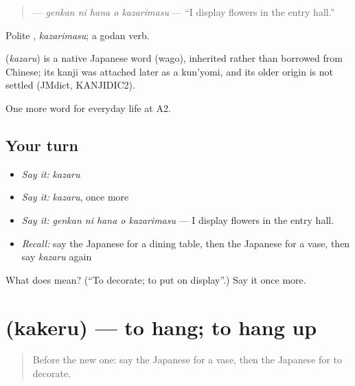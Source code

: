 \begin{quote}
\textbf{  } — \emph{genkan ni hana o kazarimasu} — \textquotedblleft{}I display flowers in the entry hall.\textquotedblright{}
\end{quote}

Polite \textbf{}, \emph{kazarimasu}; a godan verb.

\begin{cousinweb}
\textbf{} (\emph{kazaru}) is a native Japanese word (wago), inherited rather than borrowed from Chinese; its kanji was attached later as a kun'yomi, and its older origin is not settled (JMdict, KANJIDIC2).
\end{cousinweb}

\begin{grammarlens}[title={What you've built}]
One more word for everyday life at A2.
\end{grammarlens}

\subsection*{Your turn}
\begin{itemize}
\raggedright
  \item \emph{Say it:} \emph{kazaru}
  \item \emph{Say it:} \emph{kazaru}, once more
  \item \emph{Say it:} \emph{genkan ni hana o kazarimasu} — I display flowers in the entry hall.
  \item \emph{Recall:} say the Japanese for a dining table, then the Japanese for a vase, then say \emph{kazaru} again
\end{itemize}

\begin{tcolorbox}[breakable,colback=teal!4,colframe=teal!35!black,title={Before you move on}]
What does  mean? (\textquotedblleft{}To decorate; to put on display\textquotedblright{}.) Say it once more.
\end{tcolorbox}
\section[\texorpdfstring{\ja{かける} (kakeru)}{かける (kakeru)}]{ (kakeru) — to hang; to hang up}

\label{lesson:JA-C157-kakeru}



\begin{quote}
Before the new one: say the Japanese for a vase, then the Japanese for to decorate.
\end{quote}

